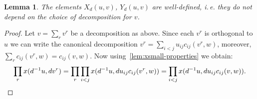 \documentclass[oneside, 10pt]{amsart}
\numberwithin{equation}{section}
\newtheorem{lemma}{Lemma}
\numberwithin{lemma}{section}
\theoremstyle{definition}
\theoremstyle{remark}
\begin{document}
\begin{lemma} \label{lem:xy-wd}
 The elements $X_d(u, v)$, $Y_d(u, v)$ are well-defined, i.\,e. they do not depend on the choice of decomposition for $v$.
\end{lemma}
\begin{proof}
\begin{comment}
 Decompose each factor $x(d^{-1}u, dv_i)$ further using the canonical decomposition of $v_i$ and then 
  use relations~\eqref{item:xsmall-scalar}--\eqref{item:xsmall-commute} to reorder and collect factors
  in such a way that  arrive to the canonical decomposition of $v$ by (cf.~with Tulenbaev's argument after~\cite[Lemma~1.1]{Tu83}).
\end{comment} 
 Let $v = \sum_r v^r$ be a decomposition as above. 
 Since each $v^r$ is orthogonal to $u$ we can write the canonical decomposition  
 $v^r = \sum_{i<j} u_{ij} c_{ij}(v^r, w)$, moreover, $\sum_{r} c_{ij}(v^r, w) = c_{ij}(v, w)$.
 Now using~\cref{lem:xsmall-properties} we obtain:
 \begin{multline*} \prod\limits_r x(d^{-1}u, dv^r) = \prod\limits_{r}\prod\limits_{i<j} x(d^{-1} u, du_{ij}c_{ij}(v^r, w)) =
  \prod\limits_{i<j} x(d^{-1} u, d u_{ij}c_{ij}(v, w)). \qedhere \end{multline*}
\end{proof}
\end{document}
